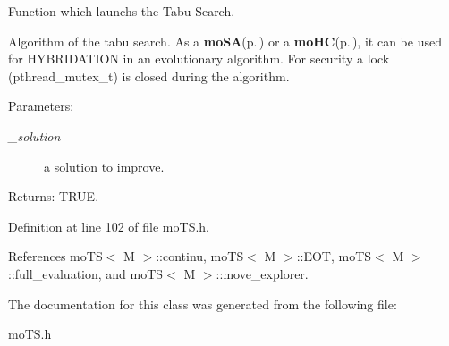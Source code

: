 Function which launchs the Tabu Search. 

Algorithm of the tabu search. As a {\bf mo\-SA}{\rm (p.\,\pageref{classmo_s_a})} or a {\bf mo\-HC}{\rm (p.\,\pageref{classmo_h_c})}, it can be used for HYBRIDATION in an evolutionary algorithm. For security a lock (pthread\_\-mutex\_\-t) is closed during the algorithm.

\begin{Desc}
\item[Parameters:]
\begin{description}
\item[{\em \_\-solution}]a solution to improve. \end{description}
\end{Desc}
\begin{Desc}
\item[Returns:]TRUE. \end{Desc}


Definition at line 102 of file mo\-TS.h.

References mo\-TS$<$ M $>$::continu, mo\-TS$<$ M $>$::EOT, mo\-TS$<$ M $>$::full\_\-evaluation, and mo\-TS$<$ M $>$::move\_\-explorer.

The documentation for this class was generated from the following file:\begin{CompactItemize}
\item 
mo\-TS.h\end{CompactItemize}
